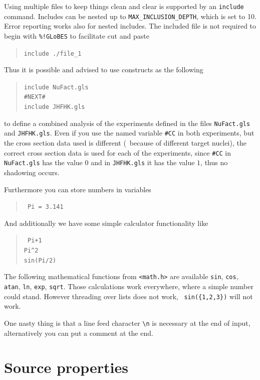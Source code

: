 Using multiple files to keep things clean and clear is supported by 
 an {\tt include} command. Includes can be nested up 
 to {\tt MAX\_INCLUSION\_DEPTH}, which is set to 10. Error reporting works 
 also for nested includes. The included file is not required to begin 
 with {\tt \%!GLoBES} to facilitate cut and paste
\begin{quote}
{\tt include ./file\_1}
\end{quote}

Thus it is possible and advised to use constructs as the following
\begin{quote}
{\tt    include NuFact.gls\\
        \#NEXT\#\\
        include JHFHK.gls
}
\end{quote}
to define a combined analysis of the experiments defined in the files 
{\tt NuFact.gls} and {\tt JHFHK.gls}. Even if you use the named 
variable {\tt \#CC} in both experiments, but the cross section data used 
is different (\eg\ because of different target nuclei), the correct 
cross section data is used for each of the experiments, since {\tt \#CC} 
in {\tt NuFact.gls} has the value $0$ and
in {\tt JHFHK.gls} it has the value $1$, thus no shadowing occurs.

Furthermore you can store numbers in variables
\begin{quote}
{\tt
Pi = 3.141
}
\end{quote}
And additionally we have some simple calculator functionality like
\begin{quote}
{\tt
Pi+1\\
\verb+Pi^2+\\
sin(Pi/2)\\
}
\end{quote}
The following mathematical functions from {\tt <math.h>} are available 
{\tt sin}, {\tt cos}, {\tt atan}, {\tt ln}, {\tt exp}, {\tt sqrt}. 
Those calculations work everywhere, where
a simple number could stand. However threading over lists does not
 work, \eg\ {\tt sin(\{1,2,3\})} will not work. 

One nasty thing is that a line feed character \verb+\n+ is necessary at
 the end of input, alternatively you can put a comment at the end.
\section{Source properties}
\label{sec:source}

